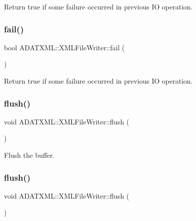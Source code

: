 Return true if some failure occurred in previous IO operation. 

\mbox{\label{classADATXML_1_1XMLFileWriter_a0294354e26b7ad1be1ca75f470db4788}} 
\subsubsection{\texorpdfstring{fail()}{fail()}\hspace{0.1cm}{\footnotesize\ttfamily [3/3]}}
{\footnotesize\ttfamily bool A\+D\+A\+T\+X\+M\+L\+::\+X\+M\+L\+File\+Writer\+::fail (\begin{DoxyParamCaption}{ }\end{DoxyParamCaption})}



Return true if some failure occurred in previous IO operation. 

\mbox{\label{classADATXML_1_1XMLFileWriter_a63097bd3fafbcf99804b4106700b524d}} 
\subsubsection{\texorpdfstring{flush()}{flush()}\hspace{0.1cm}{\footnotesize\ttfamily [1/3]}}
{\footnotesize\ttfamily void A\+D\+A\+T\+X\+M\+L\+::\+X\+M\+L\+File\+Writer\+::flush (\begin{DoxyParamCaption}{ }\end{DoxyParamCaption})}



Flush the buffer. 

\mbox{\label{classADATXML_1_1XMLFileWriter_a63097bd3fafbcf99804b4106700b524d}} 
\subsubsection{\texorpdfstring{flush()}{flush()}\hspace{0.1cm}{\footnotesize\ttfamily [2/3]}}
{\footnotesize\ttfamily void A\+D\+A\+T\+X\+M\+L\+::\+X\+M\+L\+File\+Writer\+::flush (\begin{DoxyParamCaption}{ }\end{DoxyParamCaption})}



